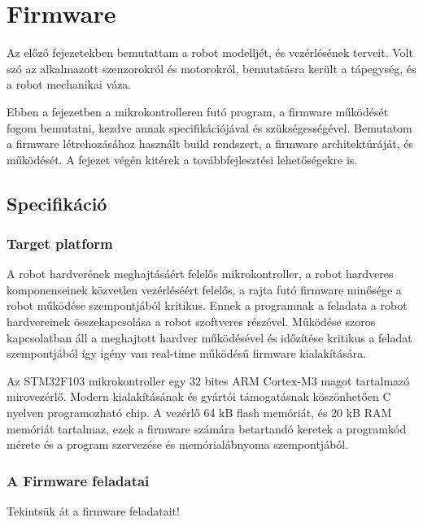 \chapter{Firmware}


Az előző fejezetekben bemutattam a robot modelljét, és vezérlésének terveit. Volt
szó az alkalmazott szenzorokról és motorokról, bemutatásra került a tápegység, és
a robot mechanikai váza.

Ebben a fejezetben a mikrokontrolleren futó program, a firmware működését fogom
bemutatni, kezdve annak specifikációjával és szükségességével. Bemutatom a
firmware létrehozásához használt build rendszert, a firmware architektúráját, és
működését. A fejezet végén kitérek a továbbfejlesztési lehetőségekre is.

\section{Specifikáció}

\subsection{Target platform}

A robot hardverének meghajtásáért felelős mikrokontroller, a robot hardveres
komponenseinek közvetlen vezérléséért felelős, a rajta futó firmware minősége a
robot működése szempontjából kritikus. Ennek a programnak a feladata a robot
hardvereinek összekapcsolása a robot szoftveres részével. Működése szoros
kapcsolatban áll a meghajtott hardver működésével és időzítése kritikus a feladat
szempontjából így igény van real-time működésű firmware kialakítására.

Az STM32F103 mikrokontroller egy 32 bites ARM Cortex-M3 magot tartalmazó
mirovezérlő. Modern kialakításának és gyártói támogatásnak köszönhetően C nyelven
programozható chip. A vezérlő 64 kB flash memóriát, és 20 kB RAM memóriát
tartalmaz, ezek a firmware számára betartandó keretek a programkód mérete és a
program szervezése és memórialábnyoma szempontjából.

\subsection{A Firmware feladatai}

Tekintsük át a firmware feladatait!

